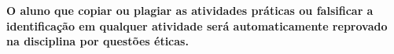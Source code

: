 \documentclass{UnBExam}%
\begin{document}
        \textbf{O aluno que copiar ou plagiar as atividades práticas ou falsificar a identificação em qualquer atividade será automaticamente reprovado na disciplina por questões éticas.}
\end{document}
